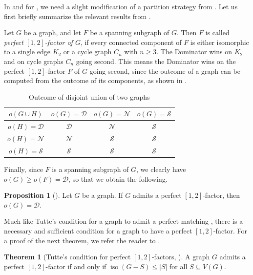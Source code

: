 \documentclass[a4paper,11pt,oneside]{scrartcl}
\theoremstyle{definition}
\newtheorem{theorem}[definition]{Theorem}
\newtheorem{proposition}[definition]{Proposition}
\theoremstyle{remark}
\DeclareMathOperator{\iso}{iso}
\begin{document}
In  and for , we need a slight modification of a partition strategy from \cite{BDGLP}. Let us first briefly summarize the relevant results from \cite{BDGLP}.

Let $G$ be a graph, and let $F$ be a spanning subgraph of $G$. Then $F$ is called \emph{perfect $[1,2]$-factor of $G$}, if every connected component of $F$ is either isomorphic to a single edge $K_2$ or a cycle graph $C_n$ with $n \geq 3$. The Dominator wins on $K_2$ and on cycle graphs $C_n$ going second. This means the Dominator wins on the perfect $[1,2]$-factor $F$ of $G$ going second, since the outcome of a graph can be computed from the outcome of its components, as shown in . 
\begin{table}[!ht]
    \centering
    \begin{tabular}{c  c  c  c }
        \toprule
        $o(G \cup H)$ & $o(G) = \mathcal D$ & $o(G) = \mathcal N$ & $o(G) = \mathcal S$ \\
        \midrule
        $o(H) = \mathcal D$ & $\mathcal D$ & $\mathcal N$ & $\mathcal S$ \\
        $o(H) = \mathcal N$ & $\mathcal N$ & $\mathcal S$ & $\mathcal S$ \\
        $o(H) = \mathcal S$ & $\mathcal S$ & $\mathcal S$ & $\mathcal S$ \\\bottomrule
    \end{tabular}
    \caption{Outcome of disjoint union of two graphs}
    \label{table:outcome_of_disjoint_union}
\end{table}

Finally, since $F$ is a spanning subgraph of $G$, we clearly have $o(G) \geq o(F) = \mathcal D$, so that we obtain the following.


\begin{proposition}[{\cite[Lemma 3.1]{BDGLP}}]
    \label{proposition:perfect_1_2-factor_implies_Dominator_wins}
    Let $G$ be a graph. If $G$ admits a perfect $[1,2]$-factor, then $o(G) = \mathcal D$.
\end{proposition}

Much like Tutte's condition for a graph to admit a perfect matching \cite{Tutte1947}, there is a necessary and sufficient condition for a graph to have a perfect $[1,2]$-factor. For a proof of the next theorem, we refer the reader to \cite[Theorem 7.2]{Akiyama_Kano_book}.

\begin{theorem}[Tutte's condition for perfect ${[1,2]}$-factors, \cite{Tutte_1953}]
    \label{theorem:Tutte_condition_for_perfect_1_2-factor}
    A graph $G$ admits a perfect $[1,2]$-factor if and only if $\iso(G-S) \leq |S|$ for all $S \subseteq V(G)$.
\end{theorem} 
\end{document}
